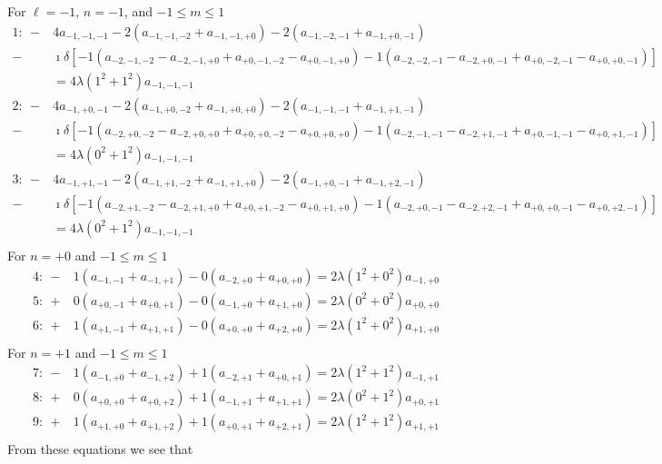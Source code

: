 \documentclass{article}
\newcommand{\0}{\mathbf{0}}
\newcommand{\1}{\mathbf{1}}
\newcommand{\2}{\mathbf{2}}
\newcommand{\3}{\mathbf{3}}
\newcommand{\4}{\mathbf{4}}
\newcommand{\5}{\mathbf{5}}
\newcommand{\6}{\mathbf{6}}
\newcommand{\7}{\mathbf{7}}
\newcommand{\8}{\mathbf{8}}
\begin{document}
For $\ell=-1$, $n=-1$, and $-1\leq m\leq1$
%
\begin{align*} 
 1: \
 -&4a_{-1,-1,-1}
 -2(a_{-1,-1,-2}+a_{-1,-1,+0})-2(a_{-1,-2,-1}+a_{-1,+0,-1})\\
 -&\imath\delta[-1(a_{-2,-1,-2}-a_{-2,-1,+0}+a_{+0,-1,-2}-a_{+0,-1,+0})
      -1(a_{-2,-2,-1}-a_{-2,+0,-1}+a_{+0,-2,-1}-a_{+0,+0,-1})]\\  
 &=4\lambda(1^2+1^2)a_{-1,-1,-1}\\
 2: \
 -&4a_{-1,+0,-1}
 -2(a_{-1,+0,-2}+a_{-1,+0,+0})-2(a_{-1,-1,-1}+a_{-1,+1,-1})\\
 -&\imath\delta[-1(a_{-2,+0,-2}-a_{-2,+0,+0}+a_{+0,+0,-2}-a_{+0,+0,+0})
      -1(a_{-2,-1,-1}-a_{-2,+1,-1}+a_{+0,-1,-1}-a_{+0,+1,-1})]\\  
 &=4\lambda(0^2+1^2)a_{-1,-1,-1}\\
  3: \
 -&4a_{-1,+1,-1}
 -2(a_{-1,+1,-2}+a_{-1,+1,+0})-2(a_{-1,+0,-1}+a_{-1,+2,-1})\\
 -&\imath\delta[-1(a_{-2,+1,-2}-a_{-2,+1,+0}+a_{+0,+1,-2}-a_{+0,+1,+0})
      -1(a_{-2,+0,-1}-a_{-2,+2,-1}+a_{+0,+0,-1}-a_{+0,+2,-1})]\\  
 &=4\lambda(0^2+1^2)a_{-1,-1,-1}\\
\end{align*}
For $n=+0$ and $-1\leq m\leq1$
%
\begin{align*} 
 4:\ -&1(a_{-1,-1}+a_{-1,+1})  -0(a_{-2,+0}+a_{+0,+0})=2\lambda(1^2+0^2)a_{-1,+0}\\
 5:\ +&0(a_{+0,-1}+a_{+0,+1}) -0(a_{-1,+0}+a_{+1,+0})=2\lambda(0^2+0^2)a_{+0,+0}\\
 6:\ +&1(a_{+1,-1}+a_{+1,+1}) -0(a_{+0,+0}+a_{+2,+0})=2\lambda(1^2+0^2)a_{+1,+0}\\ 
\end{align*}
%
For $n=+1$ and $-1\leq m\leq1$
%
\begin{align*}
 7:\  -&1(a_{-1,+0}+a_{-1,+2})  +1(a_{-2,+1}+a_{+0,+1})=2\lambda(1^2+1^2)a_{-1,+1}\\
 8:\  +&0(a_{+0,+0}+a_{+0,+2}) +1(a_{-1,+1}+a_{+1,+1})=2\lambda(0^2+1^2)a_{+0,+1}\\
 9:\  +&1(a_{+1,+0}+a_{+1,+2}) +1(a_{+0,+1}+a_{+2,+1})=2\lambda(1^2+1^2)a_{+1,+1}\\
\end{align*}
%
%
From these equations we see that
\end{document}
